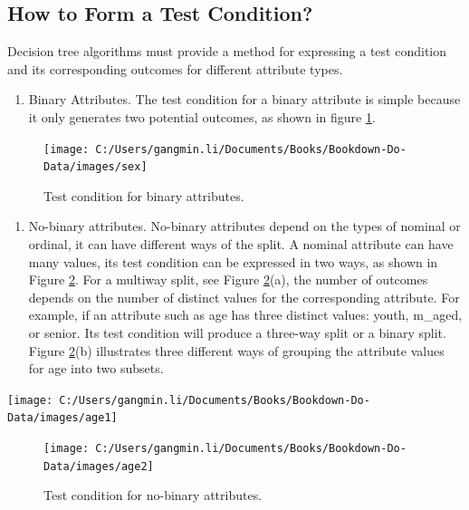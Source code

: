 \documentclass[
]{book}
\providecommand{\tightlist}{%
  \setlength{\itemsep}{0pt}\setlength{\parskip}{0pt}}
\begin{document}
\hypertarget{test_condition}{%
\subsection*{How to Form a Test Condition?}\label{test_condition}}


Decision tree algorithms must provide a method for expressing a test condition and its corresponding outcomes for different attribute types.

\begin{enumerate}
\def\labelenumi{\arabic{enumi}.}
\tightlist
\item
  Binary Attributes. The test condition for a binary attribute is simple because it only generates two potential outcomes, as shown in figure \ref{fig:sex}.
\end{enumerate}

\begin{figure}

{\centering \texttt{[image: C:/Users/gangmin.li/Documents/Books/Bookdown-Do-Data/images/sex]} 

}

\caption{Test condition for binary attributes.}\label{fig:sex}
\end{figure}

\begin{enumerate}
\def\labelenumi{\arabic{enumi}.}
\setcounter{enumi}{1}
\tightlist
\item
  No-binary attributes. No-binary attributes depend on the types of nominal or ordinal, it can have different ways of the split. A nominal attribute can have many values, its test condition can be expressed in two ways, as shown in Figure \ref{fig:age2}. For a multiway split, see Figure \ref{fig:age2}(a), the number of outcomes depends on the number of distinct values for the corresponding attribute. For example, if an attribute such as age has three distinct values: youth, m\_aged, or senior. Its test condition will produce a three-way split or a binary split. Figure \ref{fig:age2}(b) illustrates three different ways of grouping the attribute values for age into two subsets.
\end{enumerate}

\begin{center}\texttt{[image: C:/Users/gangmin.li/Documents/Books/Bookdown-Do-Data/images/age1]} \end{center}
\begin{figure}

{\centering \texttt{[image: C:/Users/gangmin.li/Documents/Books/Bookdown-Do-Data/images/age2]} 

}

\caption{Test condition for no-binary attributes.}\label{fig:age2}
\end{figure}
\end{document}
